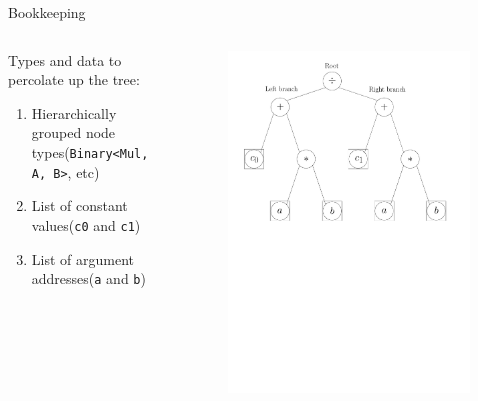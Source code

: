 \documentclass[xcolor=dvipsnames]{beamer}
\begin{document}
\begin{frame}[fragile]{Bookkeeping}
  \begin{columns}[T] %
    \begin{column}{0.5\textwidth}
      Types and data to percolate up the tree: \vspace{5mm}
      \begin{enumerate}
      \item Hierarchically grouped node types\newline ({\color{blue}\texttt{Binary<Mul, A, B>}}, etc) \vspace{5mm}
      \item List of constant values\newline ({\color{blue}\texttt{c0}} and {\color{blue}\texttt{c1}}) \vspace{5mm}
      \item List of argument addresses\newline ({\color{blue}\texttt{a}} and {\color{blue}\texttt{b}}) \vspace{5mm}
      \end{enumerate}
    \end{column}%
    \hfill%
    \begin{column}{0.5\textwidth}
\begin{figure}[H]
 \centering
 \includegraphics[width=0.99\textwidth]{fig_exprtree}
\end{figure}
    \end{column}%
  \end{columns}
\end{frame}
\end{document}
